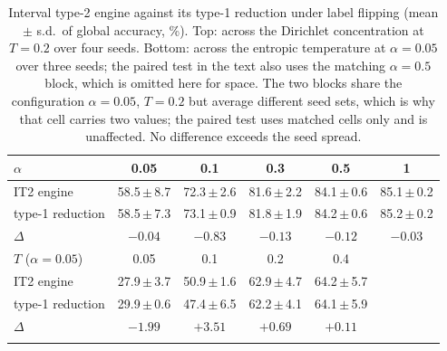 \begin{table}[t]
\centering
\caption{Interval type-2 engine against its type-1 reduction under label flipping (mean $\pm$ s.d.\ of global accuracy, \%). Top: across the Dirichlet concentration at $T=0.2$ over four seeds. Bottom: across the entropic temperature at $\alpha=0.05$ over three seeds; the paired test in the text also uses the matching $\alpha=0.5$ block, which is omitted here for space. The two blocks share the configuration $\alpha=0.05$, $T=0.2$ but average different seed sets, which is why that cell carries two values; the paired test uses matched cells only and is unaffected. No difference exceeds the seed spread.}
\label{tab:fou}
\setlength{\tabcolsep}{2.2pt}
\footnotesize
\begin{tabular}{lccccc}
\toprule
$\alpha$ & 0.05 & 0.1 & 0.3 & 0.5 & 1\\
\midrule
IT2 engine & 58.5\,$\pm$\,8.7 & 72.3\,$\pm$\,2.6 & 81.6\,$\pm$\,2.2 & 84.1\,$\pm$\,0.6 & 85.1\,$\pm$\,0.2\\
type-1 reduction & 58.5\,$\pm$\,7.3 & 73.1\,$\pm$\,0.9 & 81.8\,$\pm$\,1.9 & 84.2\,$\pm$\,0.6 & 85.2\,$\pm$\,0.2\\
$\Delta$ & $-0.04$ & $-0.83$ & $-0.13$ & $-0.12$ & $-0.03$\\
\midrule
$T$ ($\alpha=0.05$) & 0.05 & 0.1 & 0.2 & 0.4 & \\
\midrule
IT2 engine & 27.9\,$\pm$\,3.7 & 50.9\,$\pm$\,1.6 & 62.9\,$\pm$\,4.7 & 64.2\,$\pm$\,5.7 & \\
type-1 reduction & 29.9\,$\pm$\,0.6 & 47.4\,$\pm$\,6.5 & 62.2\,$\pm$\,4.1 & 64.1\,$\pm$\,5.9 & \\
$\Delta$ & $-1.99$ & $+3.51$ & $+0.69$ & $+0.11$ & \\
\botrule
\end{tabular}
\end{table}
